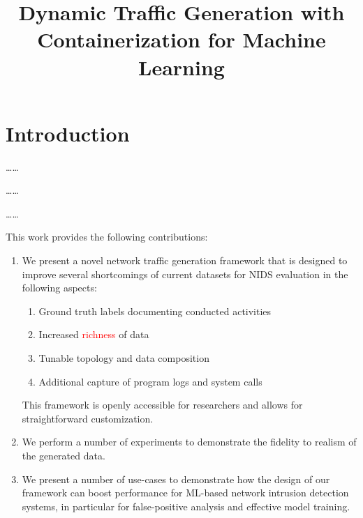 \documentclass[sigconf]{acmart}
\begin{document}
\title{Dynamic Traffic Generation with Containerization for Machine Learning}



\begin{abstract}

\end{abstract}


\maketitle

\section{Introduction}


\dots \dots

\dots \dots

\dots \dots

This work provides the following contributions:

\begin{enumerate}
\item We present a novel network traffic generation framework that is designed to improve several shortcomings of current datasets for NIDS evaluation in the following aspects:
\begin{enumerate}
\item Ground truth labels documenting conducted activities
\item Increased \textcolor{red}{richness} of data
\item Tunable topology and data composition
\item Additional capture of program logs and system calls
\end{enumerate}
This framework is openly accessible for researchers and allows for straightforward customization.
 
\item We perform a number of experiments to demonstrate the fidelity to realism of the generated data.
\item We present a number of use-cases to demonstrate how the design of our framework can boost performance for ML-based network intrusion detection systems, in particular for false-positive analysis and effective model training.
\end{enumerate}
\end{document}
